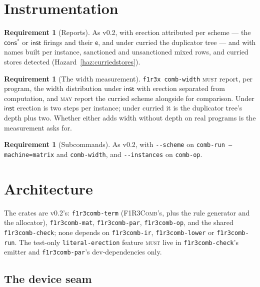 \documentclass[11pt,a4paper]{article}
\newcommand{\code}[1]{\texttt{#1}}
\newcommand{\Comb}{\textsc{F1R3Comb}}
\newcommand{\MUST}{\textsc{must}}
\newcommand{\MAY}{\textsc{may}}
\newcommand{\ev}{\mathsf{e}}
\theoremstyle{definition}
\newtheorem{requirement}[definition]{Requirement}
\theoremstyle{plain}
\newcommand{\inst}{\mathsf{inst}}
\newcommand{\cstar}{\mathsf{cons}^{*}}
\begin{document}
\section{Instrumentation}\label{sec:instr}

\begin{requirement}[Reports]\label{req:reports}
As v0.2, with erection attributed per scheme --- the $\cstar$ or $\inst$
firings and their $\ev$, and under curried the duplicator tree --- and with
names built per instance, sanctioned and unsanctioned mixed rows, and curried
stores detected (Hazard~\ref{haz:curriedstores}).
\end{requirement}

\begin{requirement}[The width measurement]\label{req:widthcmd}
\code{f1r3x comb-width} \MUST{} report, per program, the width distribution
under $\inst$ with erection separated from computation, and \MAY{} report the
curried scheme alongside for comparison. Under $\inst$
erection is two steps per instance; under curried it is the duplicator tree's
depth plus two. Whether either adds width without depth on real programs is
the measurement \cite[Obl.~13.7]{matnote} asks for.
\end{requirement}

\begin{requirement}[Subcommands]\label{req:fx}
As v0.2, with \code{-{}-scheme} on \code{comb-run --machine=matrix} and
\code{comb-width}, and \code{-{}-instances} on \code{comb-op}.
\end{requirement}

\section{Architecture}\label{sec:arch}

The crates are v0.2's: \code{f1r3comb-term} (\Comb's, plus the rule generator
and the allocator), \code{f1r3comb-mat}, \code{f1r3comb-par},
\code{f1r3comb-op}, and the shared \code{f1r3comb-check}; none depends on
\code{f1r3comb-ir}, \code{f1r3comb-lower} or \code{f1r3comb-run}. The
test-only \code{literal-erection} feature \MUST{} live in
\code{f1r3comb-check}'s emitter and \code{f1r3comb-par}'s dev-dependencies
only.

\subsection{The device seam}\label{sec:device}
\end{document}
